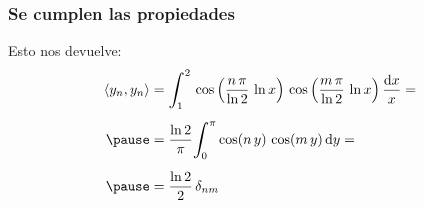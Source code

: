 \documentclass[12pt]{beamer}
\begin{document}
\begin{frame}
\frametitle{Se cumplen las propiedades}
Esto nos devuelve:
\pause
\begin{eqnarray}
\begin{aligned}[b]
\langle y_{n}, y_{n} \rangle &= \scaleint{6ex}_{\bs 1}^{2} \, \cos \left( \dfrac{n \, \pi}{\ln 2} \, \ln x \right) \, \cos \left( \dfrac{m \, \pi}{\ln 2} \, \ln x \right) \dfrac{\dd{x}}{x} = \\[0.5em] \pause
&= \dfrac{\ln 2}{\pi} \scaleint{6ex}_{\bs 0}^{\pi} \cos (n \, y) \, \cos (m \, y) \dd{y} = \\[0.5em] \pause
&= \dfrac{\ln 2}{2} \, \delta_{nm}
\end{aligned}
\label{eq:ecuacion_04_16}
\end{eqnarray}
\end{frame}                
\end{document}
